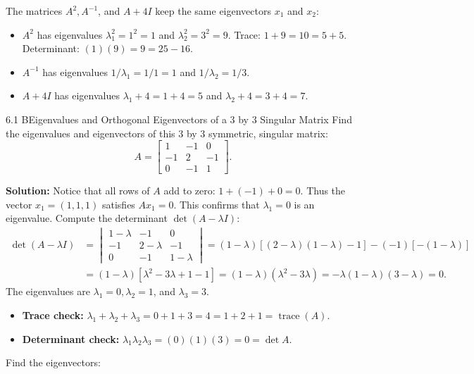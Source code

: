 \documentclass[11pt,a4paper,openany,oneside]{book}
\def\vect#1{#1}%
\def\mathbf#1{#1}%
\newcommand{\vect}[1]{\mathbf{#1}}
\numberwithin{equation}{chapter}
\begin{document}
The matrices $A^2, A^{-1}$, and $A + 4I$ keep the same eigenvectors $\vect{x}_1$ and $\vect{x}_2$:
\begin{itemize}
\item $A^2$ has eigenvalues $\lambda_1^2 = 1^2 = 1$ and $\lambda_2^2 = 3^2 = 9$. Trace: $1+9 = 10 = 5+5$. Determinant: $(1)(9) = 9 = 25 - 16$.
\item $A^{-1}$ has eigenvalues $1/\lambda_1 = 1/1 = 1$ and $1/\lambda_2 = 1/3$.
\item $A + 4I$ has eigenvalues $\lambda_1 + 4 = 1 + 4 = 5$ and $\lambda_2 + 4 = 3 + 4 = 7$.
\end{itemize}

\begin{example}{6.1 B}{Eigenvalues and Orthogonal Eigenvectors of a 3 by 3 Singular Matrix}
Find the eigenvalues and eigenvectors of this $3$ by $3$ symmetric, singular matrix:
\[
A = \begin{bmatrix} 1 & -1 & 0 \\ -1 & 2 & -1 \\ 0 & -1 & 1 \end{bmatrix}.
\]
\end{example}
\textbf{Solution:} Notice that all rows of $A$ add to zero: $1 + (-1) + 0 = 0$. Thus the vector $\vect{x}_1 = (1, 1, 1)$ satisfies $A\vect{x}_1 = \vect{0}$. This confirms that $\lambda_1 = 0$ is an eigenvalue.
Compute the determinant $\det(A - \lambda I)$:
\begin{align*}
\det(A - \lambda I) &= \begin{vmatrix} 1-\lambda & -1 & 0 \\ -1 & 2-\lambda & -1 \\ 0 & -1 & 1-\lambda \end{vmatrix} = (1-\lambda)[(2-\lambda)(1-\lambda) - 1] - (-1)[-(1-\lambda)] \\
&= (1-\lambda)[\lambda^2 - 3\lambda + 1 - 1] = (1-\lambda)(\lambda^2 - 3\lambda) = -\lambda(1-\lambda)(3-\lambda) = 0.
\end{align*}
The eigenvalues are $\lambda_1 = 0, \lambda_2 = 1$, and $\lambda_3 = 3$.
\begin{itemize}
\item \textbf{Trace check:} $\lambda_1 + \lambda_2 + \lambda_3 = 0 + 1 + 3 = 4 = 1 + 2 + 1 = \operatorname{trace}(A)$.
\item \textbf{Determinant check:} $\lambda_1\lambda_2\lambda_3 = (0)(1)(3) = 0 = \det A$.
\end{itemize}
Find the eigenvectors:
\end{document}
